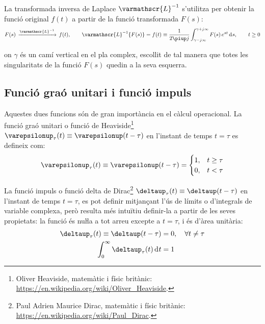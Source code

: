La transformada inversa de Laplace $\varmathscr{L}^{-1}$ s'utilitza per
obtenir la funció original $f(t)$ a partir de la funció
transformada $F(s)$:
\begin{equation}
	F(s)\,\xrightarrow{\varmathscr{L}^{-1}}\,f(t), \qquad
    \varmathscr{L}^{-1}\{F(s)\} = f(t) \equiv \frac{1}{2 \piup j }
    \int_{\gamma-j \infty}^{\gamma+j \infty} F(s)\, e^{s t} \diff s,
    \qquad t\geq 0 \label{eq:transf_inv_laplace}
\end{equation}

on $\gamma$ és un camí vertical en el pla complex, escollit de tal
manera que totes les singularitats de la funció $F(s)$ quedin a la
seva esquerra.

\subsection{Funció graó unitari i funció impuls} 

Aquestes dues funcions són de gran importància en el càlcul
operacional. La funció graó unitari o funció de Heaviside\footnote{Oliver Heaviside, matemàtic i físic britànic: \href{https://en.wikipedia.org/wiki/Oliver_Heaviside}{https:/\!\!/en.wikipedia.org/wiki/Oliver\_Heaviside}.}
$\varepsilonup_\tau(t) \equiv \varepsilonup(t-\tau)$ en l'instant de temps
$t=\tau$ es defineix com:
\begin{equation}
    \varepsilonup_\tau(t) \equiv \varepsilonup(t-\tau) = \begin{cases} 1, & t \geq \tau \\ 0, & t < \tau \end{cases}
\end{equation}

La funció impuls o funció delta de Dirac\footnote{Paul Adrien Maurice Dirac, matemàtic i físic britànic: \href{https://en.wikipedia.org/wiki/Paul_Dirac}{https:/\!\!/en.wikipedia.org/wiki/Paul\_Dirac}.} $\deltaup_\tau(t) \equiv
\deltaup(t-\tau)$ en l'instant de temps $t=\tau$, es pot definir
mitjançant l'ús de límits o d'integrals de variable complexa, però
resulta més intuïtiu definir-la a partir de les seves propietats: la
funció és nuŀla a tot arreu excepte a $t=\tau$, i és d'àrea
unitària:
\begin{subequations}
\begin{align}
    \deltaup_\tau(t) \equiv \deltaup(t-\tau) &= 0, \quad \forall t \neq \tau \\
    \int_0^\infty \deltaup_\tau(t) \diff t &= 1
\end{align}
\end{subequations}

